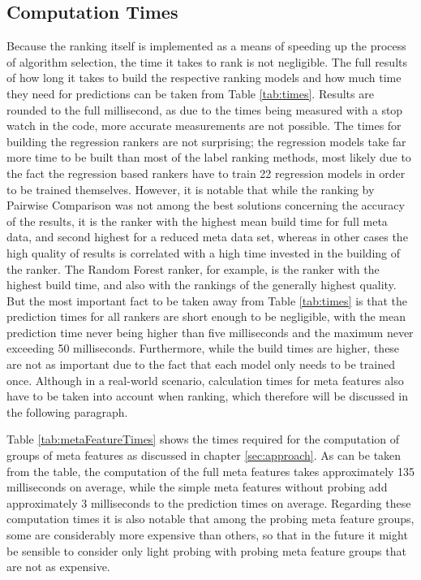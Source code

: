 \subsection{Computation Times}

Because the ranking itself is implemented as a means of speeding up the process of algorithm selection, the time it takes to rank is not negligible. The full results of how long it takes to build the respective ranking models and how much time they need for predictions can be taken from Table \ref{tab:times}. Results are rounded to the full millisecond, as due to the times being measured with a stop watch in the code, more accurate measurements are not possible. The times for building the regression rankers are not surprising; the regression models take far more time to be built than most of the label ranking methods, most likely due to the fact the regression based rankers have to train 22 regression models in order to be trained themselves. However, it is notable that while the ranking by Pairwise Comparison was not among the best solutions concerning the accuracy of the results, it is the ranker with the highest mean build time for full meta data, and second highest for a reduced meta data set, whereas in other cases the high quality of results is correlated with a high time invested in the building of the ranker. The Random Forest ranker, for example, is the ranker with the highest build time, and also with the rankings of the generally highest quality. But the most important fact to be taken away from Table \ref{tab:times} is that the prediction times for all rankers are short enough to be negligible, with the mean prediction time never being higher than five milliseconds and the maximum never exceeding 50 milliseconds. Furthermore, while the build times are higher, these are not as important due to the fact that each model only needs to be trained once. Although in a real-world scenario, calculation times for meta features also have to be taken into account when ranking, which therefore will be discussed in the following paragraph.



Table \ref{tab:metaFeatureTimes} shows the times required for the computation of groups of meta features as discussed in chapter \ref{sec:approach}. As can be taken from the table, the computation of the full meta features takes approximately 135 milliseconds on average, while the simple meta features without probing add approximately 3 milliseconds to the prediction times on average. Regarding these computation times it is also notable that among the probing meta feature groups, some are considerably more expensive than others, so that in the future it might be sensible to consider only light probing with probing meta feature groups that are not as expensive.

